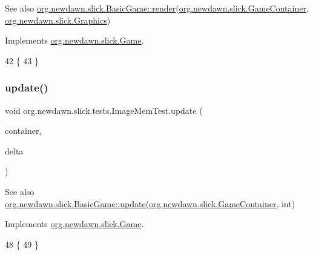 \begin{DoxySeeAlso}{See also}
\mbox{\hyperlink{interfaceorg_1_1newdawn_1_1slick_1_1_game_af1a4670d43eb3ba04dfcf55ab1975b64}{org.\+newdawn.\+slick.\+Basic\+Game\+::render}}(\mbox{\hyperlink{classorg_1_1newdawn_1_1slick_1_1_game_container}{org.\+newdawn.\+slick.\+Game\+Container}}, \mbox{\hyperlink{classorg_1_1newdawn_1_1slick_1_1_graphics}{org.\+newdawn.\+slick.\+Graphics}}) 
\end{DoxySeeAlso}


Implements \mbox{\hyperlink{interfaceorg_1_1newdawn_1_1slick_1_1_game_af1a4670d43eb3ba04dfcf55ab1975b64}{org.\+newdawn.\+slick.\+Game}}.


\begin{DoxyCode}
42                                                             \{
43     \}
\end{DoxyCode}
\mbox{\label{classorg_1_1newdawn_1_1slick_1_1tests_1_1_image_mem_test_a90e3269c81066560825d9be380d3a4d0}} 
\subsubsection{\texorpdfstring{update()}{update()}}
{\footnotesize\ttfamily void org.\+newdawn.\+slick.\+tests.\+Image\+Mem\+Test.\+update (\begin{DoxyParamCaption}\item[{\mbox{\hyperlink{classorg_1_1newdawn_1_1slick_1_1_game_container}{Game\+Container}}}]{container,  }\item[{int}]{delta }\end{DoxyParamCaption})\hspace{0.3cm}{\ttfamily [inline]}}

\begin{DoxySeeAlso}{See also}
\mbox{\hyperlink{classorg_1_1newdawn_1_1slick_1_1_basic_game_acfe6fa05aef83bff1631af91a3e4bd20}{org.\+newdawn.\+slick.\+Basic\+Game\+::update}}(\mbox{\hyperlink{classorg_1_1newdawn_1_1slick_1_1_game_container}{org.\+newdawn.\+slick.\+Game\+Container}}, int) 
\end{DoxySeeAlso}


Implements \mbox{\hyperlink{interfaceorg_1_1newdawn_1_1slick_1_1_game_ab07b2e9463ee4631620dde0de25bdee8}{org.\+newdawn.\+slick.\+Game}}.


\begin{DoxyCode}
48                                                            \{
49     \}
\end{DoxyCode}
